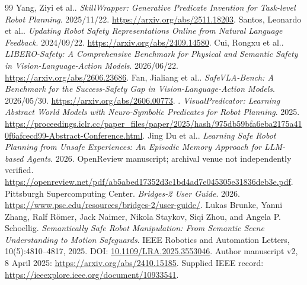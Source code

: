 \begin{thebibliography}{99}
 Yang, Ziyi et al.. \emph{SkillWrapper: Generative Predicate Invention for Task-level Robot Planning}. 2025/11/22.  \url{https://arxiv.org/abs/2511.18203}.
 Santos, Leonardo et al.. \emph{Updating Robot Safety Representations Online from Natural Language Feedback}. 2024/09/22.  \url{https://arxiv.org/abs/2409.14580}.
 Cui, Rongxu et al.. \emph{LIBERO-Safety: A Comprehensive Benchmark for Physical and Semantic Safety in Vision-Language-Action Models}. 2026/06/22.  \url{https://arxiv.org/abs/2606.23686}.
 Fan, Jialiang et al.. \emph{SafeVLA-Bench: A Benchmark for the Success-Safety Gap in Vision-Language-Action Models}. 2026/05/30.  \url{https://arxiv.org/abs/2606.00773}.
 . \emph{VisualPredicator: Learning Abstract World Models with Neuro-Symbolic Predicates for Robot Planning}. 2025.  \url{https://proceedings.iclr.cc/paper_files/paper/2025/hash/975db59bfa6eba2175a410f6afcecd99-Abstract-Conference.html}.
 Jing Du et al.. \emph{Learning Safe Robot Planning from Unsafe Experiences: An Episodic Memory Approach for LLM-based Agents}. 2026. OpenReview manuscript; archival venue not independently verified. \url{https://openreview.net/pdf/ab5abed17352d3c1bd4ad7e045305e31836deb3e.pdf}.
 Pittsburgh Supercomputing Center. \emph{Bridges-2 User Guide}. 2026.  \url{https://www.psc.edu/resources/bridges-2/user-guide/}.
 Lukas Brunke, Yanni Zhang, Ralf R\"omer, Jack Naimer, Nikola Staykov, Siqi Zhou, and Angela P. Schoellig. \emph{Semantically Safe Robot Manipulation: From Semantic Scene Understanding to Motion Safeguards}. IEEE Robotics and Automation Letters, 10(5):4810--4817, 2025. DOI: \href{https://doi.org/10.1109/LRA.2025.3553046}{10.1109/LRA.2025.3553046}. Author manuscript v2, 8 April 2025: \url{https://arxiv.org/abs/2410.15185}. Supplied IEEE record: \url{https://ieeexplore.ieee.org/document/10933541}.
\end{thebibliography}
